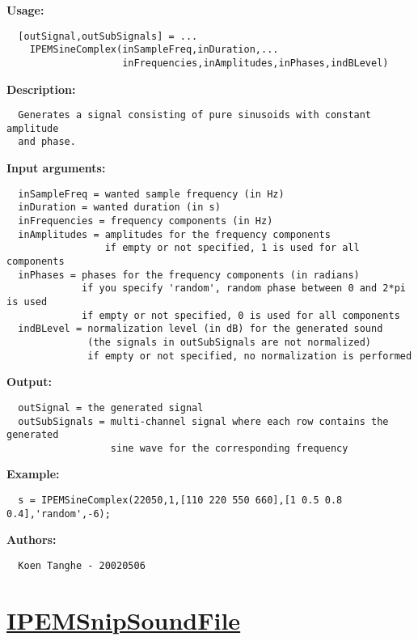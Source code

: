 \textbf{Usage:}
\begin{verbatim}  [outSignal,outSubSignals] = ...
    IPEMSineComplex(inSampleFreq,inDuration,...
                    inFrequencies,inAmplitudes,inPhases,indBLevel)

\end{verbatim}
\textbf{Description:}
\begin{verbatim}  Generates a signal consisting of pure sinusoids with constant amplitude
  and phase.

\end{verbatim}
\textbf{Input arguments:}
\begin{verbatim}  inSampleFreq = wanted sample frequency (in Hz)
  inDuration = wanted duration (in s)
  inFrequencies = frequency components (in Hz)
  inAmplitudes = amplitudes for the frequency components
                 if empty or not specified, 1 is used for all components
  inPhases = phases for the frequency components (in radians)
             if you specify 'random', random phase between 0 and 2*pi is used
             if empty or not specified, 0 is used for all components
  indBLevel = normalization level (in dB) for the generated sound
              (the signals in outSubSignals are not normalized)
              if empty or not specified, no normalization is performed

\end{verbatim}
\textbf{Output:}
\begin{verbatim}  outSignal = the generated signal
  outSubSignals = multi-channel signal where each row contains the generated
                  sine wave for the corresponding frequency

\end{verbatim}
\textbf{Example:}
\begin{verbatim}  s = IPEMSineComplex(22050,1,[110 220 550 660],[1 0.5 0.8 0.4],'random',-6);

\end{verbatim}
\textbf{Authors:}
\begin{verbatim}  Koen Tanghe - 20020506
\end{verbatim}


\newpage
\section*{\hyperlink{Concepts:IPEMSnipSoundFile}{IPEMSnipSoundFile}}
\hypertarget{FuncRef:IPEMSnipSoundFile}{}

